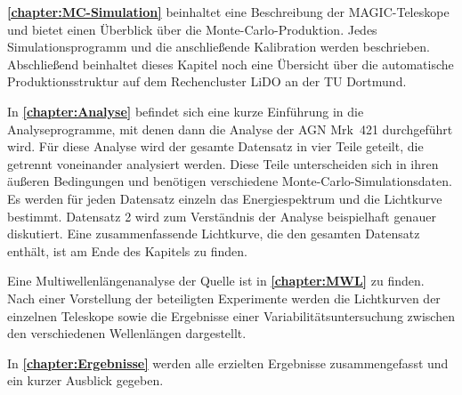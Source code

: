 \textbf{\autoref{chapter:MC-Simulation}} beinhaltet eine Beschreibung der MAGIC-Teleskope und bietet einen Überblick über die Monte-Carlo-Produktion.
Jedes Simulationsprogramm und die anschließende Kalibration werden beschrieben.
Abschließend beinhaltet dieses Kapitel noch eine Übersicht über die automatische Produktionsstruktur auf dem Rechencluster LiDO an der TU Dortmund.

In \textbf{\autoref{chapter:Analyse}} befindet sich eine kurze Einführung in die Analyseprogramme, mit denen dann die Analyse der AGN Mrk~421 durchgeführt wird.
Für diese Analyse wird der gesamte Datensatz in vier Teile geteilt, die getrennt voneinander analysiert werden.
Diese Teile unterscheiden sich in ihren äußeren Bedingungen und benötigen verschiedene Monte-Carlo-Simulationsdaten.
Es werden für jeden Datensatz einzeln das Energiespektrum und die Lichtkurve bestimmt.
Datensatz 2 wird zum Verständnis der Analyse beispielhaft genauer diskutiert.
Eine zusammenfassende Lichtkurve, die den gesamten Datensatz enthält, ist am Ende des Kapitels zu finden.

Eine Multiwellenlängenanalyse der Quelle ist in \textbf{\autoref{chapter:MWL}} zu finden.
Nach einer Vorstellung der beteiligten Experimente werden die Lichtkurven der einzelnen Teleskope sowie die Ergebnisse einer Variabilitätsuntersuchung zwischen den verschiedenen Wellenlängen  dargestellt.

In \textbf{\autoref{chapter:Ergebnisse}} werden alle erzielten Ergebnisse zusammengefasst und ein kurzer Ausblick gegeben.